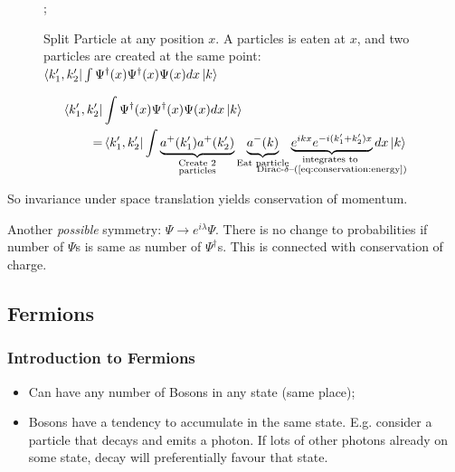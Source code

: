 \documentclass[]{article}
\begin{document}
\begin{figure}[H]
	\begin{center}
		\caption[Split Particle at any position $x$]{Split Particle at any position $x$. A particles is eaten at $x$, and two particles are created at the same point: $\bra{k_1^\prime,k_2^\prime}\int \Psi^\dagger(x)\Psi^\dagger(x)\Psi(x) dx\ket{k}$}\label{fig:split:particle}
		;
	\end{center}
\end{figure}

\begin{align*}
	\bra{k_1^\prime,k_2^\prime}&\int \Psi^\dagger(x)\Psi^\dagger(x)\Psi(x) dx\ket{k}\\
	=&\bra{k_1^\prime,k_2^\prime}\int \underbrace{a^+(k_1^\prime) a^+(k_2^\prime)}_{\mathclap{\substack{\text{Create 2}\\
		\text{particles}}}} \underbrace{a^-(k)}_\text{Eat particle} \underbrace{e^{ikx} e^{-i(k_1^\prime+k_2^\prime)x}}_{\mathclap{\substack{\text{integrates to }\\
	\text{Dirac-$\delta$--(\ref{eq:conservation:energy})}}}} dx\ket{k}
\end{align*}

So invariance under space translation yields conservation of momentum.

Another \emph{possible} symmetry: $\Psi \rightarrow e^{i \lambda} \Psi$. There is no change to probabilities if number of $\Psi$s is same as number of $\Psi^\dagger$s. This is connected with conservation of charge.

\subsection{Fermions}

\subsubsection{Introduction to Fermions}

\begin{itemize}
	\item Can have any number of Bosons in any state (same place);
	\item Bosons have a tendency to accumulate in the same state. E.g. consider a particle that decays and emits a photon. If lots of other photons already on some state, decay will preferentially favour that state.
\end{itemize}
\end{document}
